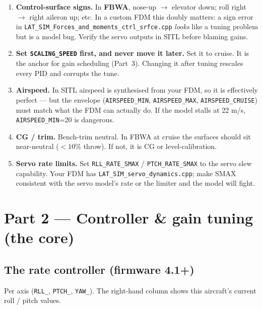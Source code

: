 \documentclass[11pt,a4paper]{article}
\newcommand{\pp}[1]{\texttt{#1}} %
\begin{document}
\begin{enumerate}[leftmargin=1.6em]
  \item \textbf{Control-surface signs.} In \textbf{FBWA}, nose-up $\rightarrow$
  elevator down; roll right $\rightarrow$ right aileron up; etc. In a custom FDM
  this doubly matters: a sign error in
  \pp{LAT\_SIM\_Forces\_and\_moments\_ctrl\_srfce.cpp} \emph{looks} like a tuning
  problem but is a model bug. Verify the servo outputs in SITL before blaming
  gains.
  \item \textbf{Set \pp{SCALING\_SPEED} first, and never move it later.} Set it
  to cruise. It is the anchor for gain scheduling (Part~3). Changing it after
  tuning rescales every PID and corrupts the tune.
  \item \textbf{Airspeed.} In SITL airspeed is synthesised from your FDM, so it is
  effectively perfect --- but the envelope (\pp{AIRSPEED\_MIN}, \pp{AIRSPEED\_MAX},
  \pp{AIRSPEED\_CRUISE}) must match what the FDM can actually do. If the model
  stalls at 22 m/s, \pp{AIRSPEED\_MIN}=20 is dangerous.
  \item \textbf{CG / trim.} Bench-trim neutral. In FBWA at cruise the surfaces
  should sit near-neutral ($<10\%$ throw). If not, it is CG or level-calibration.
  \item \textbf{Servo rate limits.} Set \pp{RLL\_RATE\_SMAX} / \pp{PTCH\_RATE\_SMAX}
  to the servo slew capability. Your FDM has \pp{LAT\_SIM\_servo\_dynamics.cpp};
  make SMAX consistent with the servo model's rate or the limiter and the model
  will fight.
\end{enumerate}

\section{Part 2 --- Controller \& gain tuning (the core)}

\subsection{The rate controller (firmware 4.1+)}

Per axis (\pp{RLL\_}, \pp{PTCH\_}, \pp{YAW\_}). The right-hand column shows this
aircraft's current roll / pitch values.
\end{document}
